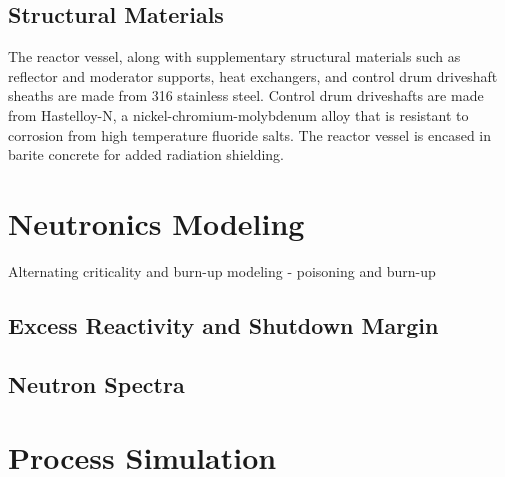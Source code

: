 \subsection{Structural Materials}
The reactor vessel, along with supplementary structural materials such as reflector and moderator supports, heat exchangers, and control drum driveshaft sheaths are made from 316 stainless steel. Control drum driveshafts are made from Hastelloy-N, a nickel-chromium-molybdenum alloy that is resistant to corrosion from high temperature fluoride salts. The reactor vessel is encased in barite concrete for added radiation shielding.

\section{Neutronics Modeling}
Alternating criticality and burn-up modeling - poisoning and burn-up

\subsection{Excess Reactivity and Shutdown Margin}


\subsection{Neutron Spectra}

\section{Process Simulation}